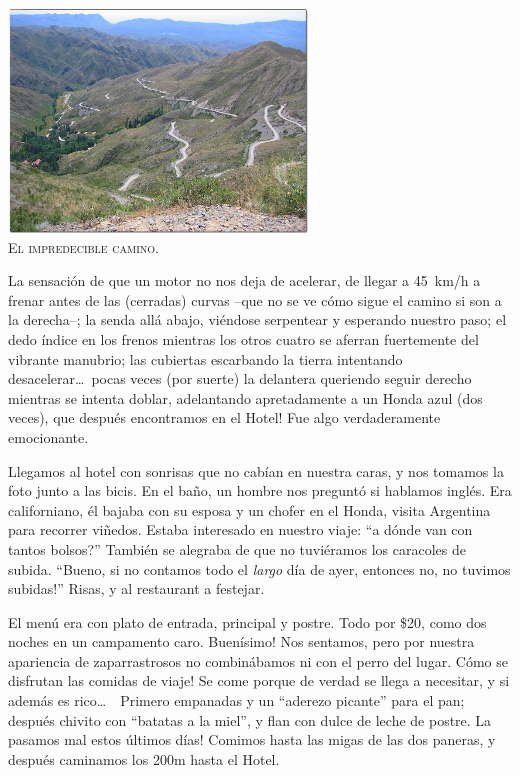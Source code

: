 \begin{center} \includegraphics[width=300px]{images/Mendoza_0450.jpg}\\
\textsc{El impredecible camino.} \end{center}

La sensaci\'on de que un motor no nos deja de acelerar, de llegar a 45~km/h a
frenar antes de las (cerradas) curvas --que no se ve c\'omo sigue el camino si
son a la derecha--; la senda all\'a abajo, vi\'endose serpentear y esperando
nuestro paso; el dedo \'indice en los frenos mientras los otros cuatro se
aferran fuertemente del vibrante manubrio; las cubiertas escarbando la tierra
intentando desacelerar\ldots\ pocas veces (por suerte) la delantera queriendo
seguir derecho mientras se intenta doblar, \textexclamdown adelantando
apretadamente a un Honda azul (dos veces), que despu\'es encontramos en el
Hotel! Fue algo verdaderamente emocionante.

Llegamos al hotel con sonrisas que no cab\'ian en nuestra caras, y nos tomamos
la foto junto a las bicis. En el ba\~no, un hombre nos pregunt\'o si hablamos
ingl\'es. Era californiano, \'el bajaba con su esposa y un chofer en el Honda,
visita Argentina para recorrer vi\~nedos. Estaba interesado en nuestro viaje:
``\textquestiondown a d\'onde van con tantos bolsos?'' Tambi\'en se alegraba de
que no tuvi\'eramos los caracoles de subida. ``Bueno, si no contamos todo el
\emph{largo} d\'ia de ayer, entonces no, \textexclamdown no tuvimos subidas!''
Risas, y al restaurant a festejar.

El men\'u era con plato de entrada, principal y postre. Todo por \$20, como dos
noches en un campamento caro. \textexclamdown Buen\'isimo! Nos sentamos, pero
por nuestra apariencia de zaparrastrosos no combin\'abamos ni con el perro del
lugar. \textexclamdown C\'omo se disfrutan las comidas de viaje! Se come porque
de verdad se llega a necesitar, y si adem\'as es rico\ldots\ \ Primero empanadas
y un ``aderezo picante'' para el pan; despu\'es chivito con ``batatas a la
miel'', y flan con dulce de leche de postre. \textexclamdown La pasamos mal
estos \'ultimos d\'ias! Comimos hasta las migas de las dos paneras, y despu\'es
caminamos los 200m hasta el Hotel.

